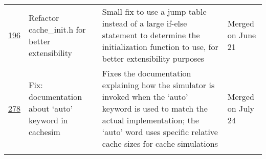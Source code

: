 \begin{longtable}{c >{\raggedright\arraybackslash}p{4cm} >{\raggedright\arraybackslash}X >{\raggedright\arraybackslash}p{2cm}}
    \addlinespace

    \href{https://github.com/1a1a11a/libCacheSim/pull/196}{196} & Refactor cache\_init.h for better extensibility & Small fix to use a jump table instead of a large if-else statement to determine the initialization function to use, for better extensibility purposes & Merged on June 21 \\

    \addlinespace
    
    \href{https://github.com/1a1a11a/libCacheSim/pull/278}{278} & Fix: documentation about `auto' keyword in cachesim & Fixes the documentation explaining how the simulator is invoked when the `auto' keyword is used to match the actual implementation; the `auto' word uses specific relative cache sizes for cache simulations & Merged on July 24 \\

    \addlinespace
    
    \bottomrule
\end{longtable}